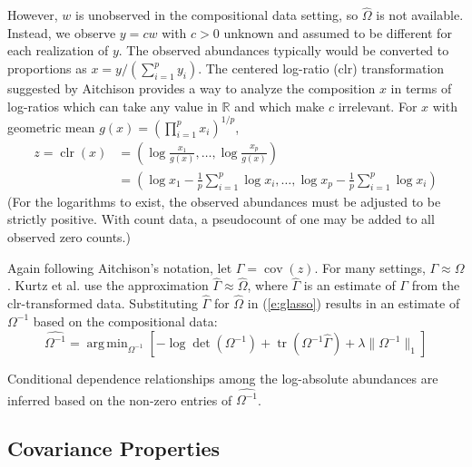 \documentclass[12pt]{article}
\newcommand{\clr}{\operatorname{clr}}
\newcommand{\cov}{\operatorname{cov}}
\DeclareMathOperator*{\argmin}{arg\,min}
\DeclareMathOperator{\tr}{tr}
\begin{document}
However, $w$ is unobserved in the compositional data setting, so $\hat{\Omega}$ is not available. Instead, we observe $y = cw$ with $c>0$ unknown and assumed to be different for each realization of $y$. The observed abundances typically would be converted to proportions as $x = y / (\sum_{i=1}^p y_i)$. The centered log-ratio (clr) transformation suggested by Aitchison provides a way to analyze the composition $x$ in terms of log-ratios which can take any value in $\mathbb{R}$ and which make $c$ irrelevant. For $x$ with geometric mean $g(x) = \left(\prod_{i=1}^p x_i\right)^{1/p}$,
\begin{equation}
\label{e:clr}
\begin{split}
z = \clr(x) &= \left( \log \frac{x_1}{g(x)}, \dots, \log \frac{x_p}{g(x)} \right) \\
&= \left( \log x_1 - \frac{1}{p} \sum_{i=1}^p \log x_i, \dots, \log x_p - \frac{1}{p} \sum_{i=1}^p \log x_i \right)
\end{split}
\end{equation}
(For the logarithms to exist, the observed abundances must be adjusted to be strictly positive. With count data, a pseudocount of one may be added to all observed zero counts.)

Again following Aitchison's notation, let $\Gamma = \cov(z)$. For many settings, $\Gamma \approx \Omega$. Kurtz et al. \citeyear{kurtz} use the approximation $\hat{\Gamma} \approx \hat{\Omega}$, where $\hat{\Gamma}$ is an estimate of $\Gamma$ from the clr-transformed data. Substituting $\hat{\Gamma}$ for $\hat{\Omega}$ in (\ref{e:glasso}) results in an estimate of $\Omega^{-1}$ based on the compositional data:
\begin{equation}
\widehat{\Omega^{-1}} = \argmin_{\Omega^{-1}} \left[ -\log \det(\Omega^{-1}) + \tr(\Omega^{-1} \hat{\Gamma}) + \lambda \lVert \Omega^{-1} \rVert_1 \right]
\end{equation}

Conditional dependence relationships among the log-absolute abundances are inferred based on the non-zero entries of $\widehat{\Omega^{-1}}$.

\subsection*{Covariance Properties}
\end{document}
